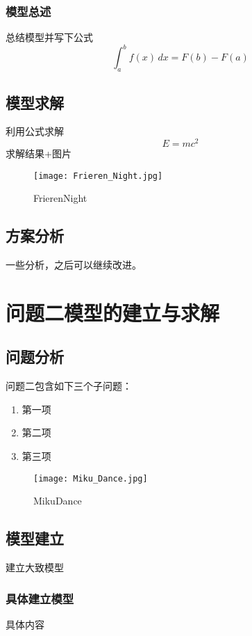 \documentclass[12pt,a4paper]{article}
\begin{document}
\subsubsection{模型总述}
总结模型并写下公式
\begin{equation}
  \int_a^b f(x) \, dx = F(b) - F(a)
\end{equation}
\subsection{模型求解}
利用公式求解
\begin{equation}
  E=mc^2
\end{equation}
求解结果+图片
\begin{figure}[H]%
  \centering
  \texttt{[image: Frieren\_Night.jpg]}
  \caption{FrierenNight}
  \label{img:Frieren_Night}    
\end{figure}

\subsection{方案分析}
一些分析，之后可以继续改进。

\section{问题二模型的建立与求解}
\subsection{问题分析}
问题二包含如下三个子问题：
\begin{enumerate}[itemsep=-0.2em,topsep=0em]
  \item 第一项
  \item 第二项
  \item 第三项
\end{enumerate}
\begin{figure}[H]%
  \centering
  \texttt{[image: Miku\_Dance.jpg]}
  \caption{MikuDance}
  \label{img:MikuDance}    
\end{figure}

\subsection{模型建立}
建立大致模型
\subsubsection{具体建立模型}
具体内容
\end{document}
